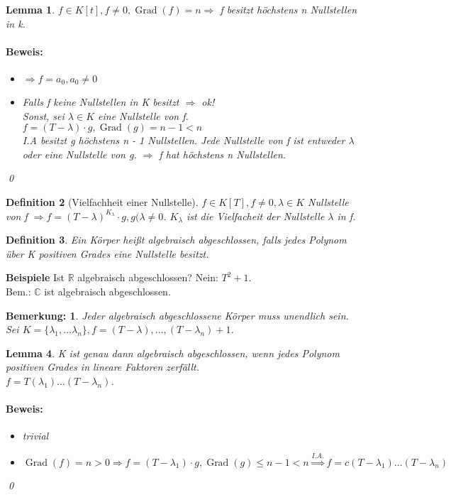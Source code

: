 \documentclass{report}
\newcommand{\lb}{\lambda}
\newcommand{\R}{\mathbb{R}}
\newcommand{\C}{\mathbb{C}}
\DeclareMathOperator{\Grad}{Grad}
\theoremstyle{customrem}
\newtheorem*{bemerkung}{Bemerkung\textnormal:}
\theoremstyle{customdef}
\newtheorem{definition}{Definition}[chapter]
\newtheorem{lemma}[definition]{Lemma}
\renewenvironment{proof}{\paragraph{Beweis: }}{\qed}
\theoremstyle{customenv}
\begin{document}
\begin{lemma}
  \(f \in K[t], f\neq 0, \Grad(f) = n
  \Rightarrow \) f besitzt h\"ochstens n Nullstellen in k.
  \begin{proof}
    \begin{itemize}
      \item[\(n=0\)]{
        \(\Rightarrow f = a_0, a_0 \neq 0\)
      }
      \item[\(n>0\)]{
        Falls f keine Nullstellen in K besitzt \(\Rightarrow\) ok!\\
        Sonst, sei \(\lb \in K\) eine Nullstelle von f.
        \(f = (T -\lb) \cdot g, \Grad(g) = n-1 < n\)\\
        I.A besitzt g h\"ochstens n - 1 Nullstellen. Jede Nullstelle von f ist
        entweder \(\lb\) oder eine Nullstelle von g. \(\Rightarrow\) f hat
        h\"ochstens n Nullstellen.\\
      }
    \end{itemize}
  \end{proof}
\end{lemma}

\begin{definition}[Vielfachheit einer Nullstelle]
  \(f \in K[T], f \neq 0, \lb \in K\) Nullstelle von f
  \(\Rightarrow f = (T-\lb)^{K_\lb}\cdot g, g(\lb \neq 0\).
  \(K_\lb\) ist die Vielfacheit der Nullstelle \(\lb\) in f.\\
\end{definition}

\begin{definition}
  Ein K\"orper hei\ss{}t algebraisch abgeschlossen, falls jedes Polynom \"uber 
  K positiven Grades eine Nullstelle besitzt.
\end{definition}

\textbf{Beispiele}
Ist \(\R\) algebraisch abgeschlossen? Nein: \(T^2 + 1\).\\
Bem.: \(\C\) ist algebraisch abgeschlossen.

\begin{bemerkung}
  Jeder algebraisch abgeschlossene K\"orper muss unendlich sein.
  Sei \(K = \{\lb_1, \dots \lb_n\}, f = (T - \lb), \dots, (T - \lb_n) + 1\).\\
\end{bemerkung}

\begin{lemma}
  K ist genau dann algebraisch abgeschlossen, wenn jedes Polynom positiven
  Grades in lineare Faktoren zerf\"allt.\\
  \(f = T(\lb_1) \dots (T - \lb_n)\).
  \begin{proof}
    \begin{itemize}
      \item[\(\Leftarrow\)]{trivial}
      \item[\(\Rightarrow\)]{
        \(
          \Grad(f) = n > 0
          \Rightarrow f = (T - \lb_1) \cdot g, \Grad(g) \le n - 1 < n
          \overset{I.A.}{\Rightarrow} f = c(T-\lb_1) \dots (T-\lb_n)
        \)
      }
    \end{itemize}
  \end{proof}
\end{lemma}
\end{document}
